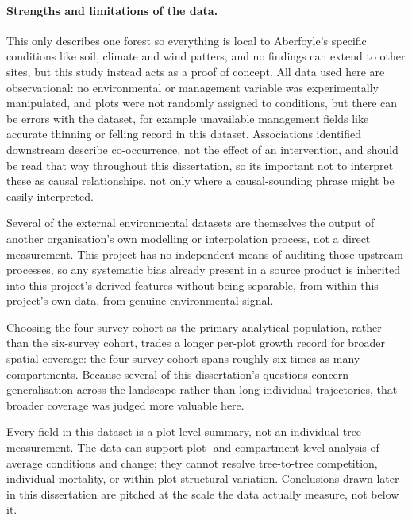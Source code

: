 \documentclass[logo,msc,ai]{infthesis}           %
\begin{document}
\paragraph*{Strengths and limitations of the data.}
\label{sec:data-strengths-limitations}
This only describes one forest so everything is local to Aberfoyle's specific conditions like soil, climate and wind patters, and no findings can extend to other sites, but this study instead acts as a proof of concept.  
All data used here are observational: no environmental or management variable was experimentally
manipulated, and plots were not randomly assigned to conditions, but there can be errors with the dataset, for example unavailable management fields like accurate thinning or felling record in this dataset. Associations identified downstream describe co-occurrence, not the effect of an intervention, and should be read that way throughout this dissertation, so its important not to interpret these as causal relationships. not only where a causal-sounding phrase might be easily interpreted. 

Several of the external environmental datasets are themselves the output of another organisation's
own modelling or interpolation process, not a direct measurement. This project has no independent
means of auditing those upstream processes, so any systematic bias already present in a source
product is inherited into this project's derived features without being separable, from within
this project's own data, from genuine environmental signal.

Choosing the four-survey cohort as the primary analytical population, rather than the six-survey
cohort, trades a longer per-plot growth record for broader spatial coverage: the four-survey
cohort spans roughly six times as many compartments. Because several of this dissertation's
questions concern generalisation across the landscape rather than long individual trajectories,
that broader coverage was judged more valuable here.

Every field in this dataset is a plot-level summary, not an individual-tree measurement. The data
can support plot- and compartment-level analysis of average conditions and change; they cannot
resolve tree-to-tree competition, individual mortality, or within-plot structural variation.
Conclusions drawn later in this dissertation are pitched at the scale the data actually measure,
not below it. 


\end{document}
